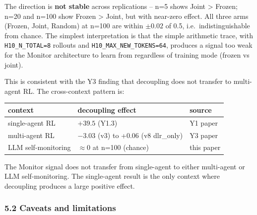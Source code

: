\documentclass[
]{article}
\newcounter{none} %
\begin{document}
The direction is \textbf{not stable} across replications -- n=5 shows
Joint \textgreater{} Frozen; n=20 and n=100 show Frozen \textgreater{}
Joint, but with near-zero effect. All three arms (Frozen, Joint, Random)
at n=100 are within \(\pm 0.02\) of 0.5, i.e.~indistinguishable from
chance. The simplest interpretation is that the simple arithmetic trace,
with \texttt{H10\_N\_TOTAL=8} rollouts and
\texttt{H10\_MAX\_NEW\_TOKENS=64}, produces a signal too weak for the
Monitor architecture to learn from regardless of training mode (frozen
vs joint).

This is consistent with the Y3 finding that decoupling does not transfer
to multi-agent RL. The cross-context pattern is:

{\def\LTcaptype{none} %
\begin{longtable}[]{@{}lll@{}}
\toprule\noalign{}
context & decoupling effect & source \\
\midrule\noalign{}
\endhead
\bottomrule\noalign{}
\endlastfoot
single-agent RL & \(+39.5\) (Y1.3) & Y1 paper \\
multi-agent RL & \(-3.03\) (v3) to +0.06 (v8 dlr\_only) & Y3 paper \\
LLM self-monitoring & \(\approx 0\) at n=100 (chance) & this paper \\
\end{longtable}
}

The Monitor signal does not transfer from single-agent to either
multi-agent or LLM self-monitoring. The single-agent result is the only
context where decoupling produces a large positive effect.

\subsubsection{5.2 Caveats and
limitations}\label{caveats-and-limitations}
\end{document}
